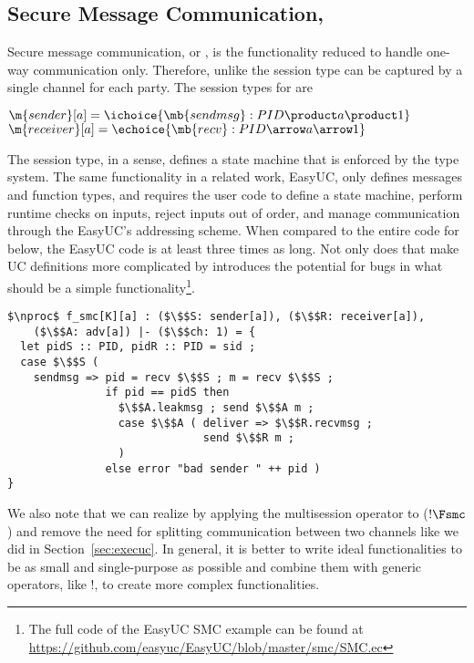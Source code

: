 \subsection{Secure Message Communication, \Fsmc}
Secure message communication, or \Fsmc, is the \Fauth functionality reduced to handle one-way communication only.
Therefore, unlike \Fauth the session type can be captured by a single channel for each party. 
The session types for \Fsmc are
{\centering
\parbox{0cm}{
\begin{tabbing}
$\m{sender}[a] = \ichoice{\mb{sendmsg}: PID \product a \product 1}$ \\
$\m{receiver}[a] = \echoice{\mb{recv}: PID \arrow a \arrow 1}$ 
\end{tabbing}}
}
The session type, in a sense, defines a state machine that is enforced by the type system.
The same functionality in a related work, EasyUC, only defines messages and function types, and requires the user code to define a state machine, perform runtime checks on inputs, reject inputs out of order, and manage communication through the EasyUC's addressing scheme. 
When compared to the entire code for \Fsmc below, the EasyUC code is at least three times as long.
Not only does that make UC definitions more complicated by introduces the potential for bugs in what should be a simple functionality\footnote{The full code of the EasyUC SMC example can be found at \url{https://github.com/easyuc/EasyUC/blob/master/smc/SMC.ec}}.
\begin{lstlisting}[basicstyle=\scriptsize\BeraMonottFamily, frame=single, mathescape]
$\nproc$ f_smc[K][a] : ($\$$S: sender[a]), ($\$$R: receiver[a]), 
	($\$$A: adv[a]) |- ($\$$ch: 1) = {
  let pidS :: PID, pidR :: PID = sid ;
  case $\$$S (
    sendmsg => pid = recv $\$$S ; m = recv $\$$S ;
               if pid == pidS then
                 $\$$A.leakmsg ; send $\$$A m ;
                 case $\$$A ( deliver => $\$$R.recvmsg ;
                              send $\$$R m ;
                 )
               else error "bad sender " ++ pid )
}
\end{lstlisting}

We also note that we can realize \Fauth by applying the multisession operator to \Fsmc ($!\Fsmc$) and remove the need for splitting communication between two channels like we did in Section~\ref{sec:execuc}.
In general, it is better to write ideal functionalities to be as small and single-purpose as possible and combine them with generic operators, like $!$, to create more complex functionalities. 


